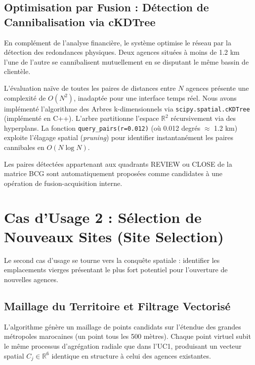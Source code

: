 \subsection{Optimisation par Fusion : Détection de Cannibalisation via cKDTree}

En complément de l'analyse financière, le système optimise le réseau par la détection des redondances physiques. Deux agences situées à moins de 1.2 km l'une de l'autre se cannibalisent mutuellement en se disputant le même bassin de clientèle.

L'évaluation naïve de toutes les paires de distances entre $N$ agences présente une complexité de $O(N^2)$, inadaptée pour une interface temps réel. Nous avons implémenté l'algorithme des Arbres k-dimensionnels via \texttt{scipy.spatial.cKDTree} (implémenté en C++). L'arbre partitionne l'espace $\mathbb{R}^2$ récursivement via des hyperplans. La fonction \texttt{query\_pairs(r=0.012)} (où 0.012 degrés $\approx$ 1.2 km) exploite l'élagage spatial (\textit{pruning}) pour identifier instantanément les paires cannibales en $O(N \log N)$.

Les paires détectées appartenant aux quadrants REVIEW ou CLOSE de la matrice BCG sont automatiquement proposées comme candidates à une opération de fusion-acquisition interne.

\section{Cas d'Usage 2 : Sélection de Nouveaux Sites (Site Selection)}

Le second cas d'usage se tourne vers la conquête spatiale : identifier les emplacements vierges présentant le plus fort potentiel pour l'ouverture de nouvelles agences.

\subsection{Maillage du Territoire et Filtrage Vectorisé}

L'algorithme génère un maillage de points candidats sur l'étendue des grandes métropoles marocaines (un point tous les 500 mètres). Chaque point virtuel subit le même processus d'agrégation radiale que dans l'UC1, produisant un vecteur spatial $C_j \in \mathbb{R}^6$ identique en structure à celui des agences existantes.

